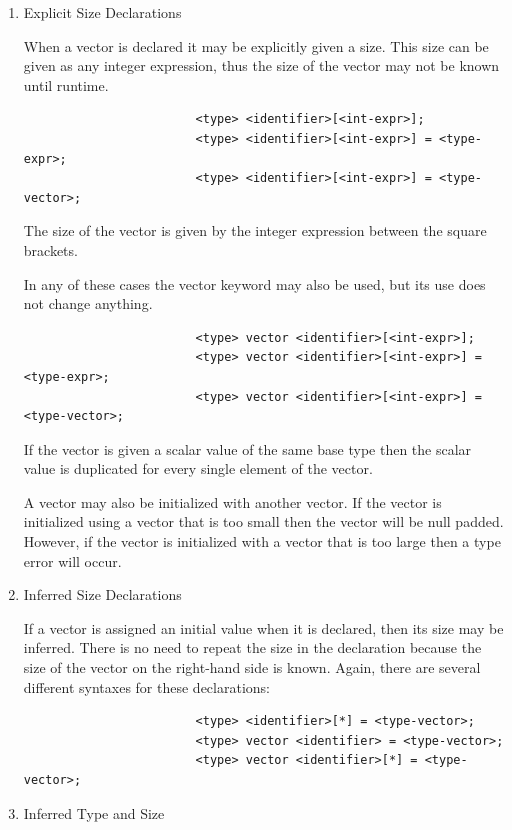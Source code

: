 \documentclass{article}
\begin{document}
			\begin{enumerate}
				\item Explicit Size Declarations

					When a vector is declared it may be explicitly given a size. This size can be given as any integer
					expression, thus the size of the vector may not be known until runtime.

					\begin{lstlisting}
						<type> <identifier>[<int-expr>];
						<type> <identifier>[<int-expr>] = <type-expr>;
						<type> <identifier>[<int-expr>] = <type-vector>;
					\end{lstlisting}

					The size of the vector is given by the integer expression between the square brackets.

					In any of these cases the vector keyword may also be used, but its use does not change anything.

					\begin{lstlisting}
						<type> vector <identifier>[<int-expr>];
						<type> vector <identifier>[<int-expr>] = <type-expr>;
						<type> vector <identifier>[<int-expr>] = <type-vector>;
					\end{lstlisting}

					If the vector is given a scalar value of the same base type then the scalar value is duplicated for
					every single element of the vector.

					A vector may also be initialized with another vector. If the vector is initialized using a vector
					that is too small then the vector will be null padded. However, if the vector is initialized with a
					vector that is too large then a type error will occur.

				\item Inferred Size Declarations

					If a vector is assigned an initial value when it is declared, then its size may be inferred. There
					is no need to repeat the size in the declaration because the size of the vector on the right-hand
					side is known. Again, there are several different syntaxes for these declarations:

					\begin{lstlisting}
						<type> <identifier>[*] = <type-vector>;
						<type> vector <identifier> = <type-vector>;
						<type> vector <identifier>[*] = <type-vector>;
					\end{lstlisting}

				\item Inferred Type and Size


\end{enumerate}
\end{document}
